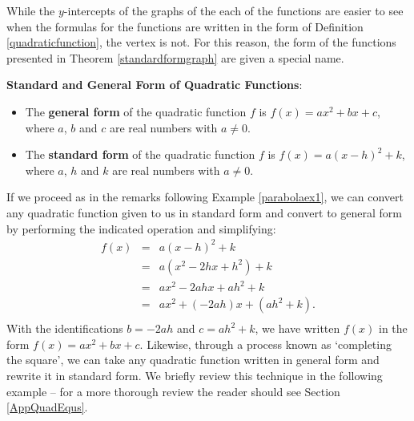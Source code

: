 \documentclass{ximera}
\begin{document}
While the $y$-intercepts of the graphs of the each of the functions are easier to see when the formulas for the functions are written in the form of Definition \ref{quadraticfunction}, the vertex is not.  For this reason, the form of the functions presented in Theorem \ref{standardformgraph} are given a special name.

\medskip

\colorbox{ResultColor}{\bbm

\begin{defn} \label{standardgeneralformofparabolas} \textbf{Standard and General Form of Quadratic Functions}: 

\begin{itemize}

\item The  \textbf{general form} of the quadratic function $f$ is $f(x) = ax^2+bx+c$, where $a$, $b$ and $c$ are real numbers with $a \neq 0$.

\item The  \textbf{standard form} of the quadratic function $f$ is $f(x) = a(x-h)^2 + k$, where $a$, $h$ and $k$ are real numbers with $a\neq 0$.

\end{itemize}

\end{defn}

\ebm}

\medskip
{}
\label{standardtogeneraldiscussion}
If we proceed as in the remarks following Example \ref{parabolaex1}, we can convert any quadratic function given to us in standard form and convert to general form by performing the indicated operation and simplifying: \[ \begin{array}{rcl}

f(x) &  = & a(x-h)^2 + k  \\
      &= &   a \left(x^2 -2hx + h^2 \right) + k  \\
      & =  & ax^2 - 2ahx + ah^2 + k   \\
      & =  & a x^2 + (-2ah)x + (ah^2+k). \\  \end{array}\] With the identifications $b = -2ah$ and $c = ah^2+k$, we have written $f(x)$ in the form $f(x) = ax^2 + bx+c$.  Likewise, through a process known as   `completing the square', we can take any quadratic function written in general form and rewrite it in standard form.  We briefly review this technique in the following example -- for a more thorough review the reader should see Section \ref{AppQuadEqus}. 
\end{document}
